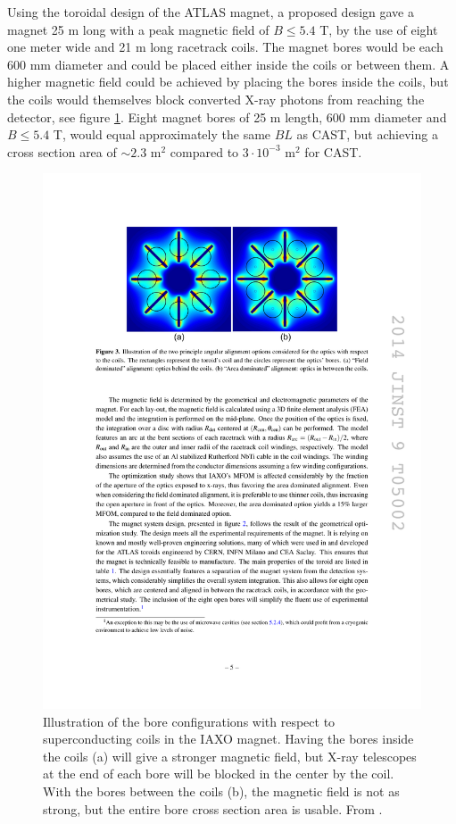 Using the toroidal design of the ATLAS magnet, a proposed design gave a magnet 25 m long with a peak magnetic field of $B \leq 5.4$ T, by the use of eight one meter wide and 21 m long racetrack coils. The magnet bores would be each 600 mm diameter and could be placed either inside the coils or between them. A higher magnetic field could be achieved by placing the bores inside the coils, but the coils would themselves block converted X-ray photons from reaching the detector, see figure \ref{fig:toroid_field}. Eight magnet bores of 25 m length, 600 mm diameter and $B \leq 5.4$ T, would equal approximately the same $BL$ as CAST, but achieving a cross section area of $\sim2.3$ m$^2$ compared to $3\cdot10^{-3}$ m$^2$ for CAST.

\begin{figure}[!h]
  \center
\includegraphics[width=0.8\linewidth]{figures/iaxo/toroid_field.pdf}
\caption{\footnotesize Illustration of the bore configurations with respect to superconducting coils in the IAXO magnet. Having the bores inside the coils (a) will give a stronger magnetic field, but X-ray telescopes at the end of each bore will be blocked in the center by the coil. With the bores between the coils (b), the magnetic field is not as strong, but the entire bore cross section area is usable. From \cite{Irastorza:2013uu}.}\label{fig:toroid_field}
\end{figure}

